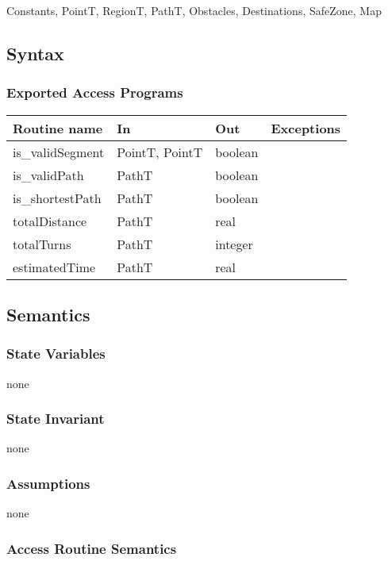 \documentclass[12pt]{article}
\begin{document}
Constants, PointT, RegionT, PathT, Obstacles, Destinations, SafeZone, Map

\subsection* {Syntax}

\subsubsection* {Exported Access Programs}

\begin{tabular}{| l | l | l | l |}
\hline
\textbf{Routine name} & \textbf{In} & \textbf{Out} & \textbf{Exceptions}\\
\hline
is\_validSegment & PointT, PointT & boolean & ~\\
\hline
is\_validPath & PathT & boolean & ~\\
\hline
is\_shortestPath & PathT & boolean & ~\\
\hline
totalDistance & PathT & real & ~\\
\hline
totalTurns & PathT & integer & ~\\
\hline
estimatedTime & PathT & real & ~\\
\hline

\end{tabular}

\subsection* {Semantics}

\subsubsection* {State Variables}

none

\subsubsection* {State Invariant}

none

\subsubsection* {Assumptions}

none

\subsubsection* {Access Routine Semantics}
\end{document}
